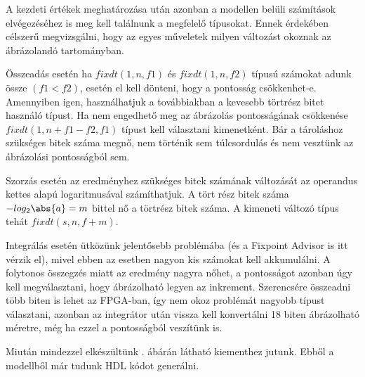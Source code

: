 A kezdeti értékek meghatározása után azonban a modellen belüli számítások elvégezéséhez is meg kell találnunk a megfelelő típusokat. Ennek érdekében célszerű megvizsgálni, hogy az egyes műveletek milyen változást okoznak az ábrázolandó tartományban.

Összeadás esetén ha $fixdt(1,n,f1)$ és $fixdt(1,n,f2)$ típusú számokat adunk össze $(f1 < f2)$, esetén el kell dönteni, hogy a pontosság csökkenhet-e. Amennyiben igen, használhatjuk a továbbiakban a kevesebb törtrész bitet használó típust. Ha nem engedhető meg az ábrázolás pontosságának csökkenése $fixdt(1,n+f1-f2,f1)$ típust kell választani kimenetként. Bár a tároláshoz szükséges bitek száma megnő, nem történik sem túlcsordulás és nem vesztünk az ábrázolási pontosságból sem.

Szorzás esetén az eredményhez szükséges bitek számának változását az operandus kettes alapú logaritmusával számíthatjuk. A tört rész bitek száma $-log_2\abs{a} = m$ bittel nő a törtrész bitek száma. A kimeneti változó típus tehát $fixdt(s,n,f+m)$.

Integrálás esetén ütközünk jelentősebb problémába (és a Fixpoint Advisor is itt vérzik el), mivel ebben az esetben nagyon kis számokat kell akkumulálni. A folytonos összegzés miatt az eredmény nagyra nőhet, a pontosságot azonban úgy kell megválasztani, hogy ábrázolható legyen az inkrement. Szerencsére összeadni több biten is lehet az FPGA-ban, így nem okoz problémát nagyobb típust választani, azonban az integrátor után vissza kell konvertálni 18 biten ábrázolható méretre, még ha ezzel a pontosságból veszítünk is.

Miután mindezzel elkészültünk . ábárán látható kiementhez jutunk. Ebből a modellből már tudunk HDL kódot generálni.

